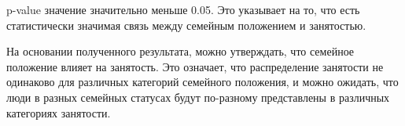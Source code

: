 \documentclass[14pt,a4paper,oneside]{extarticle}
\begin{document}
p-value значение значительно меньше 0.05. Это указывает на то, что есть
статистически значимая связь между семейным положением и занятостью.

На основании полученного результата, можно утверждать, что семейное
положение влияет на занятость. Это означает, что распределение занятости
не одинаково для различных категорий семейного положения, и можно
ожидать, что люди в разных семейных статусах будут по-разному
представлены в различных категориях занятости.
\end{document}
